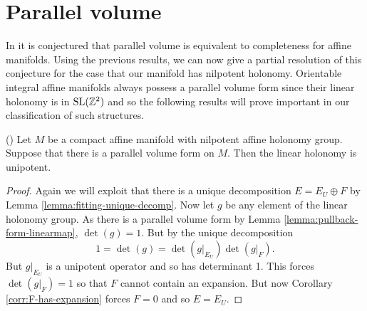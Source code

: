 \section{Parallel volume}

In \cite{markus1963cosmological} it is conjectured that parallel volume is
equivalent to completeness for affine manifolds. Using the previous results, we
can now give a partial resolution of this conjecture for the case that our
manifold has nilpotent holonomy. Orientable integral affine manifolds always
possess a parallel volume form since their linear holonomy is in
$\mathrm{SL}(\mathbb{Z}^2)$ and so the following results will prove important in our
classification of such structures.

\begin{theorem}(\cite{nilpotent-holonomy}) \label{thm:parallel-implies-unipotent}
    Let $M$ be a compact affine manifold with nilpotent affine holonomy group. Suppose that there is a parallel volume form on $M$.
    Then the linear holonomy is unipotent.
\end{theorem}

\begin{proof}
    Again we will exploit that there is a unique decomposition $E = E_U \oplus F$ by Lemma \ref{lemma:fitting-unique-decomp}. Now let $g$ be
    any element of the linear holonomy group. As there is a parallel volume form by Lemma \ref{lemma:pullback-form-linearmap}, $\det(g)=1$. But by the unique decomposition
    \[1 = \det(g) = \det(g|_{E_U}) \det(g|_F).\]
    But $g|_{E_U}$ is a unipotent operator and so has determinant 1. This forces
    $\det(g|_F)=1$ so that $F$ cannot contain an expansion. But now Corollary
    \ref{corr:F-has-expansion} forces $F=0$ and so $E = E_U$.
\end{proof}

